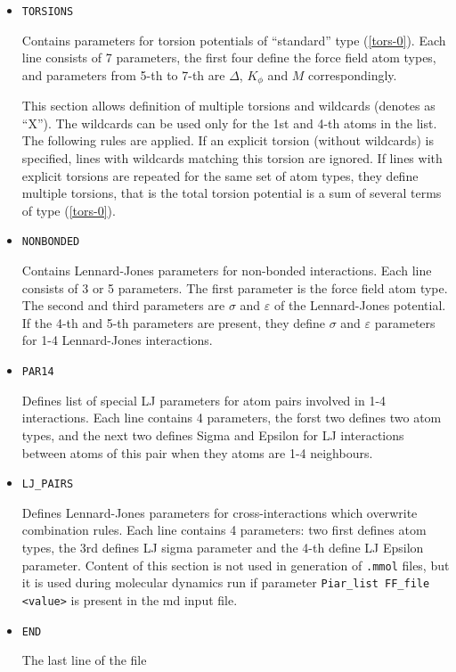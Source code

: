 \documentclass{article}
\begin{document}
\begin{itemize}
\item
\verb|TORSIONS|

Contains parameters for torsion potentials of ``standard'' type (\ref{tors-0}).
Each line consists of 7 parameters, the first four define the force field
atom types, and parameters from 5-th to 7-th are $\Delta$, $K_\phi$
and $M$ correspondingly.

This section allows definition of multiple torsions and wildcards 
(denotes as ``X''). The wildcards can be used only for the 1st and 4-th
atoms in the list. The following rules are applied. If an explicit torsion   
(without wildcards) is specified, lines with wildcards matching this 
torsion are ignored. If lines with explicit torsions are repeated 
for the same set of atom types, they define multiple torsions, that 
is the total torsion potential is a sum of several terms of type 
(\ref{tors-0}).

\item
\verb|NONBONDED|

Contains Lennard-Jones parameters for non-bonded interactions.
Each line consists of 3 or 5 parameters. The first parameter is the
force field atom type. The second and third parameters are 
$\sigma$ and $\varepsilon$ of the Lennard-Jones potential. If the 4-th and
5-th parameters are present, they define $\sigma$ and $\varepsilon$ parameters
for 1-4 Lennard-Jones interactions.  

\item
\verb|PAR14|

Defines list of special LJ parameters for atom pairs involved in 
1-4 interactions.
Each line contains 4 parameters, the forst two defines two atom types,
and the next two defines Sigma and Epsilon for LJ interactions between
atoms of this pair when they atoms are 1-4 neighbours.

\item
\verb|LJ_PAIRS|

Defines Lennard-Jones parameters for cross-interactions which overwrite
combination rules. Each line contains 4 parameters: two first defines
atom types, the 3rd defines LJ sigma parameter and the 4-th define
LJ Epsilon parameter. Content of this section is not used in generation of
\verb|.mmol| files, but it is used during molecular dynamics run if
parameter \verb|Piar_list FF_file <value>| is present in the md input file.

\item
\verb|END|

The last line of the file

\end{itemize}
\end{document}
